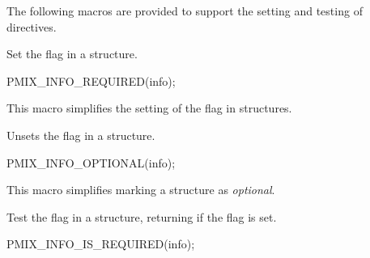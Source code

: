 The following macros are provided to support the setting and testing of  directives.


Set the  flag in a  structure.

\cspecificstart
\begin{codepar}
PMIX_INFO_REQUIRED(info);
\end{codepar}
\cspecificend

\begin{arglist}
\end{arglist}

This macro simplifies the setting of the  flag in  structures.


Unsets the  flag in a  structure.

\cspecificstart
\begin{codepar}
PMIX_INFO_OPTIONAL(info);
\end{codepar}
\cspecificend

\begin{arglist}
\end{arglist}

This macro simplifies marking a  structure as \textit{optional}.


Test the  flag in a  structure, returning  if the flag is set.

\cspecificstart
\begin{codepar}
PMIX_INFO_IS_REQUIRED(info);
\end{codepar}
\cspecificend

\begin{arglist}
\end{arglist}

